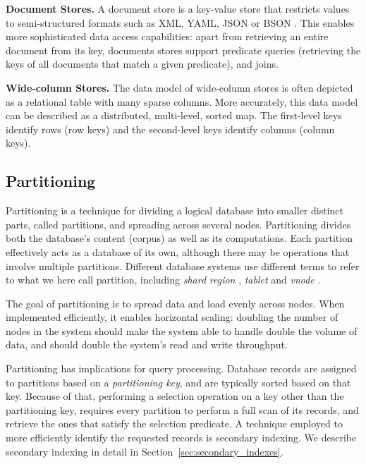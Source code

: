 \bigskip
\noindent
\textbf{Document Stores.}
A document store is a key-value store that restricts values to semi-structured formats such as
XML, YAML, JSON or BSON \cite{bson:spec}.
This enables more sophisticated data access capabilities:
apart from retrieving an entire document from its key, documents stores support predicate queries
(retrieving the keys of all documents that match a given predicate), and joins.

\bigskip
\noindent
\textbf{Wide-column Stores.}
The data model of wide-column stores is often depicted as a relational table with many sparse columns.
More accurately, this data model can be described as a distributed, multi-level, sorted map.
The first-level keys identify rows (row keys) and the second-level keys identify columns (column keys).

\subsection{Partitioning}
\label{sec:partitioning}

Partitioning is a technique for dividing a logical database into smaller distinct parts, called partitions, and spreading
across several nodes.
Partitioning divides both the database's content (corpus) as well as its computations.
Each partition effectively acts as a database of its own, although there may be operations that involve multiple partitions.
Different database systems use different terms to refer to what we here call partition, including \textit{shard} \cite{mongo:shards, elastic:shards}
\textit{region} \cite{hbase:regions}, \textit{tablet} \cite{bigtable:tablets} and \textit{vnode} \cite{cassandra:vnodes, riak:vnodes}.

The goal of partitioning is to spread data and load evenly across nodes.
When implemented efficiently, it enables horizontal scaling:
doubling the number of nodes in the system should make the system able to handle double the volume of data, and
should double the system's read and write throughput.

\medskip
\noindent
Partitioning has implications for query processing.
Database records are assigned to partitions based on a \textit{partitioning key},
and are typically sorted based on that key.
Because of that, performing a selection operation on a key other than the partitioning key,
requires every partition to perform a full scan of its records, and retrieve the ones that satisfy the selection predicate.
A technique employed to more efficiently identify the requested records is secondary indexing.
We describe secondary indexing in detail in Section~\ref{sec:secondary_indexes}.

